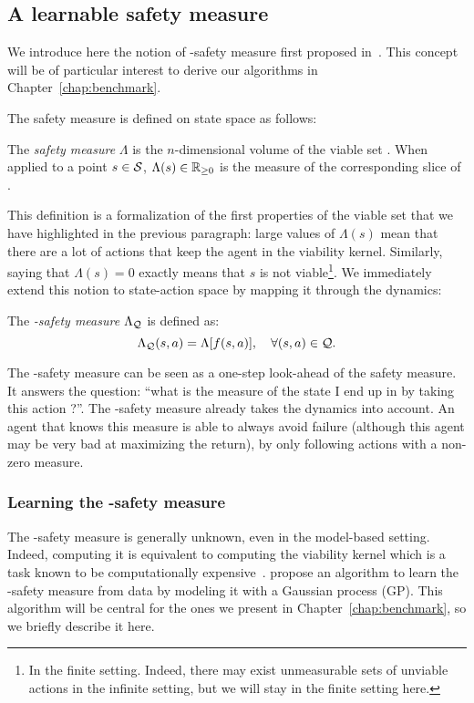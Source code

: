 	\subsection{A learnable safety measure} \label{sec:safety measure}
	We introduce here the notion of \Q-safety measure first proposed in~\cite{heim2020learnable}. This concept will be of particular interest to derive our algorithms in Chapter~\ref{chap:benchmark}.\par
	The safety measure is defined on state space as follows:
	\begin{definition}
		The\emph{ safety measure} $\Lambda$ is the $n$-dimensional volume of the viable set \QV. When applied to a point $s\in\S$, $\Lambda(s) \in \R_{\geq0}$ is the measure of the corresponding slice of \QV.
	\end{definition}
	This definition is a formalization of the first properties of the viable set that we have highlighted in the previous paragraph: large values of $\Lambda(s)$ mean that there are a lot of actions that keep the agent in the viability kernel. Similarly, saying that $\Lambda(s) = 0$ exactly means that $s$ is not viable\footnote{In the finite setting. Indeed, there may exist unmeasurable sets of unviable actions in the infinite setting, but we will stay in the finite setting here.}. We immediately extend this notion to state-action space by mapping it through the dynamics:
	\begin{definition}
		The\emph{ \Q-safety measure} $\Lambda_\Q$ is defined as:
		\begin{equation*}
			\Lambda_\Q(s, a) = \Lambda[f(s, a)],\quad \forall (s, a) \in \Q. \label{eq:q safety measure}
		\end{equation*}
	\end{definition}
	The \Q-safety measure can be seen as a one-step look-ahead of the safety measure. It answers the question: \enquote{what is the measure of the state I end up in by taking this action ?}. The \Q-safety measure already takes the dynamics into account. An agent that knows this measure is able to always avoid failure (although this agent may be very bad at maximizing the return), by only following actions with a non-zero measure.
	\subsubsection{Learning the \Q-safety measure} The \Q-safety measure is generally unknown, even in the model-based setting. Indeed, computing it is equivalent to computing the viability kernel which is a task known to be computationally expensive~\cite{aubin2011viability}. \textcite{heim2020learnable} propose an algorithm to learn the \Q-safety measure from data by modeling it with a Gaussian process (GP). This algorithm will be central for the ones we present in Chapter~\ref{chap:benchmark}, so we briefly describe it here.
